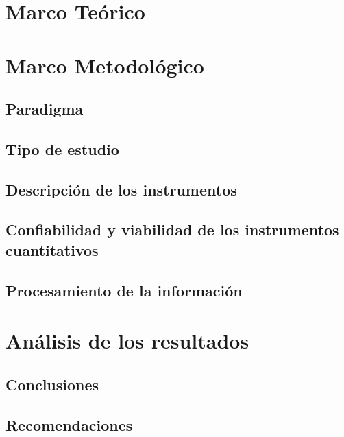 \documentclass[12pt,letterpaper,article,x11names]{memoir}
\begin{document}
\chapter{Marco Teórico}
\label{sec:orgfc5d189}
\chapter{Marco Metodológico}
\label{sec:orgfece8f2}
\section{Paradigma}
\label{sec:org2baa8af}
\section{Tipo de estudio}
\label{sec:org5be09ef}
\section{Descripción de los instrumentos}
\label{sec:org42c3fb1}
\section{Confiabilidad y viabilidad de los instrumentos cuantitativos}
\label{sec:orgc1d5e49}
\section{Procesamiento de la información}
\label{sec:orgfeb0675}
\chapter{Análisis de los resultados}
\label{sec:org0741ffb}
\section{Conclusiones}
\label{sec:orge187833}
\section{Recomendaciones}
\label{sec:org99570b5}

\printbibliography
\end{document}
